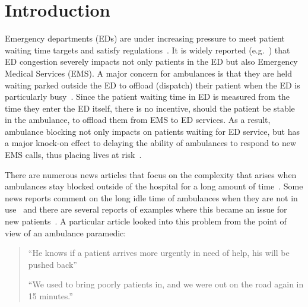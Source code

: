 \section{Introduction}

Emergency departments (EDs) are under increasing pressure to meet patient
waiting time targets and satisfy 
regulations~\cite{EmergencyDepartmentWinterPressures}.
It is widely reported (e.g.~\cite{mirror, thenews, bmj}) that ED congestion 
severely impacts not only patients in the ED but also Emergency Medical 
Services (EMS).
A major concern for ambulances is that they are held waiting parked outside the
ED to offload (dispatch) their patient when the ED is particularly 
busy~\cite{clarey2014ambulance}. 
Since the patient waiting time in ED is measured from the time they enter the
ED itself, there is no incentive, should the patient be stable in the
ambulance, to offload them from EMS to ED services.
As a result, ambulance blocking not only impacts on patients waiting for ED
service, but has a major knock-on effect to delaying the ability of ambulances
to respond to new EMS calls, thus placing lives at risk~\cite{eastanglia}.

There are numerous news articles that focus on the complexity that arises when
ambulances stay blocked outside of the hospital for a long amount of 
time~\cite{dailyrecords, staffordshirelive}.
Some news reports comment on the long idle time of ambulances when
they are not in use~\cite{herefordtimes} and there are several reports of 
examples where this became an issue for new patients~\cite{southwalesargus}.
A particular article looked into this problem from the point of view of an 
ambulance paramedic:

\begin{quotation}
    ``He knows if a patient arrives more urgently in need of help, his will be 
    pushed back''~\cite{bbcwales}

    ``We used to bring poorly patients in, and we were out on the road again in
    15 minutes.''~\cite{bbcwales}
\end{quotation}


